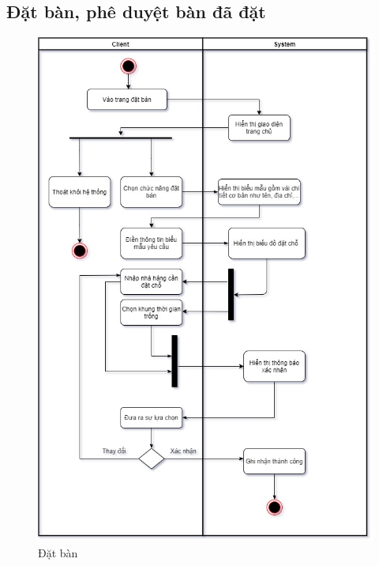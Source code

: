 \newpage
\subsection{Đặt bàn, phê duyệt bàn đã đặt}

\begin{figure}[!h]
    \begin{center}
        \includegraphics[scale=0.5]{Images/ActivityDiagram/booking_ad.jpg}
    \end{center}
    \hspace{0.3cm}
    \caption{Đặt bàn}
\end{figure}

\newpage

